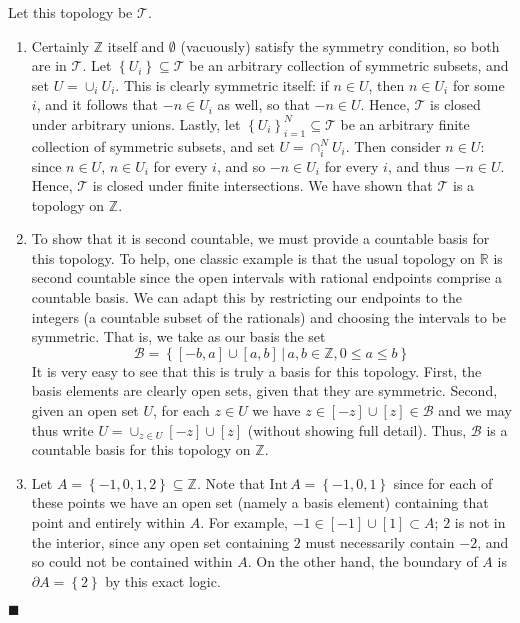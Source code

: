 \documentclass[12pt]{article}
\renewcommand{\qed}{\hfill$\blacksquare$}
\renewenvironment{proof}{\begin{addmargin}[1em]{0em}\begin{newproof}}{\end{newproof}\end{addmargin}\qed}
\begin{document}
\begin{proof}
Let this topology be $\mathcal{T}$.
\begin{enumerate}[label=(\alph*)]
	\item Certainly $\mathbb{Z}$ itself and $\emptyset$ (vacuously) satisfy the symmetry condition, so both are in $\mathcal{T}$. Let $\left\{U_i\right\} \subseteq \mathcal{T}$ be an arbitrary collection of symmetric subsets, and set $U = \cup_{i} U_i$. This is clearly symmetric itself: if $n\in U$, then $n\in U_i$ for some $i$, and it follows that $-n \in U_i$ as well, so that $-n \in U$. Hence, $\mathcal{T}$ is closed under arbitrary unions. Lastly, let $\left\{U_i\right\}_{i=1}^N \subseteq \mathcal{T}$ be an arbitrary finite collection of symmetric subsets, and set $U = \cap_{i}^N U_i$. Then consider $n\in U$: since $n\in U$, $n\in U_i$ for every $i$, and so $-n \in U_i$ for every $i$, and thus $-n \in U$. Hence, $\mathcal{T}$ is closed under finite intersections. We have shown that $\mathcal{T}$ is a topology on $\mathbb{Z}$.
	
	\item To show that it is second countable, we must provide a countable basis for this topology. To help, one classic example is that the usual topology on $\mathbb{R}$ is second countable since the open intervals with rational endpoints comprise a countable basis. We can adapt this by restricting our endpoints to the integers (a countable subset of the rationals) and choosing the intervals to be symmetric. That is, we take as our basis the set $$ \mathcal{B} = \left\{ \left[-b,a\right]\cup\left[a,b\right] \, | \, a,b\in \mathbb{Z}, 0\leq a \leq b \right\}$$ It is very easy to see that this is truly a basis for this topology. First, the basis elements are clearly open sets, given that they are symmetric. Second, given an open set $U$, for each $z\in U$ we have $z \in \left[-z\right]\cup\left[z\right] \in \mathcal{B}$ and we may thus write $U = \cup_{z\in U} \left[-z\right]\cup\left[z\right]$ (without showing full detail). Thus, $\mathcal{B}$ is a countable basis for this topology on $\mathbb{Z}$.
	
	\item Let $A=\left\{-1,0,1,2\right\}\subseteq \mathbb{Z}$. Note that $\text{Int}\, A = \left\{-1,0,1\right\}$ since for each of these points we have an open set (namely a basis element) containing that point and entirely within $A$. For example, $-1 \in \left[-1\right]\cup\left[1\right] \subset A$; $2$ is not in the interior, since any open set containing $2$ must necessarily contain $-2$, and so could not be contained within $A$. On the other hand, the boundary of $A$ is $\partial A = \left\{2\right\}$ by this exact logic.
	

\end{enumerate}
\end{proof}
\end{document}
